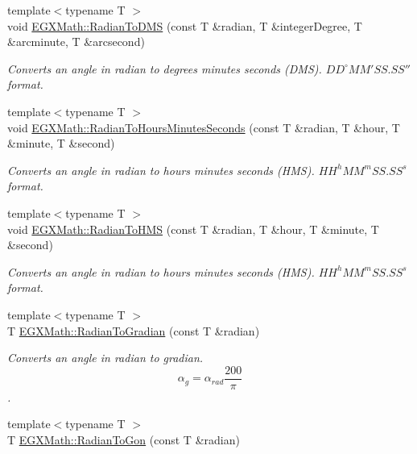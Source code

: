 \begin{DoxyCompactItemize}
{\footnotesize template$<$typename T $>$ }\\void \mbox{\hyperlink{group___e_g_x_math-_angle_conversions-_radian_gaf80be0c5c65ccaa5544a08a7754f3575}{E\+G\+X\+Math\+::\+Radian\+To\+D\+MS}} (const T \&radian, T \&integer\+Degree, T \&arcminute, T \&arcsecond)
\begin{DoxyCompactList}\small\item\em Converts an angle in radian to degrees minutes seconds (D\+MS). ${DD}^{\circ}{MM}'{SS.SS}''$ format. \end{DoxyCompactList}\item 
{\footnotesize template$<$typename T $>$ }\\void \mbox{\hyperlink{group___e_g_x_math-_angle_conversions-_radian_ga3467598d89af2b8ff68af50b39bb19e2}{E\+G\+X\+Math\+::\+Radian\+To\+Hours\+Minutes\+Seconds}} (const T \&radian, T \&hour, T \&minute, T \&second)
\begin{DoxyCompactList}\small\item\em Converts an angle in radian to hours minutes seconds (H\+MS). ${HH}^h{MM}^m{SS.SS}^s$ format. \end{DoxyCompactList}\item 
{\footnotesize template$<$typename T $>$ }\\void \mbox{\hyperlink{group___e_g_x_math-_angle_conversions-_radian_ga55b5fba9307f34ab8db57391789a90cc}{E\+G\+X\+Math\+::\+Radian\+To\+H\+MS}} (const T \&radian, T \&hour, T \&minute, T \&second)
\begin{DoxyCompactList}\small\item\em Converts an angle in radian to hours minutes seconds (H\+MS). ${HH}^h{MM}^m{SS.SS}^s$ format. \end{DoxyCompactList}\item 
{\footnotesize template$<$typename T $>$ }\\T \mbox{\hyperlink{group___e_g_x_math-_angle_conversions-_radian_ga3c1607eae50cbf0186c42485bb3878d5}{E\+G\+X\+Math\+::\+Radian\+To\+Gradian}} (const T \&radian)
\begin{DoxyCompactList}\small\item\em Converts an angle in radian to gradian. \[\alpha_{g}=\alpha_{rad}\frac{200}{\pi}\]. \end{DoxyCompactList}\item 
{\footnotesize template$<$typename T $>$ }\\T \mbox{\hyperlink{group___e_g_x_math-_angle_conversions-_radian_ga36912e5a810b64c271c4dafc17f4ca45}{E\+G\+X\+Math\+::\+Radian\+To\+Gon}} (const T \&radian)

\end{DoxyCompactItemize}
